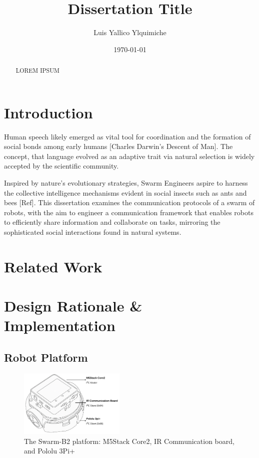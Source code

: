 \documentclass[conference]{IEEEtran}
\title{Dissertation Title}
\author{Luis Yallico Ylquimiche}
\date{\today}
\begin{document}
\maketitle

\begin{abstract}
LOREM IPSUM
\end{abstract}


\section{Introduction}
Human speech likely emerged as vital tool for coordination and the formation of social bonds among early humans [Charles Darwin's Descent of Man]. The concept, that language evolved as an adaptive trait via natural selection is widely accepted by the scientific community. 

Inspired by nature's evolutionary strategies, Swarm Engineers aspire to harness the collective intelligence mechanisms evident in social insects such as ants and bees [Ref]. This dissertation examines the communication protocols of a swarm of robots, with the aim to engineer a communication framework that enables robots to efficiently share information and collaborate on tasks, mirroring the sophisticated social interactions found in natural systems.

\section{Related Work}

\section{Design Rationale \& Implementation}
\subsection{Robot Platform}\label{sec:robot_platform}
\begin{figure}[h]
    \centering
    \includegraphics[width=0.45\textwidth]{B2.pdf}
    \caption{The Swarm-B2 platform: M5Stack Core2, IR Communication board, and Pololu 3Pi+}
    \label{fig:B2}
\end{figure}
\end{document}
